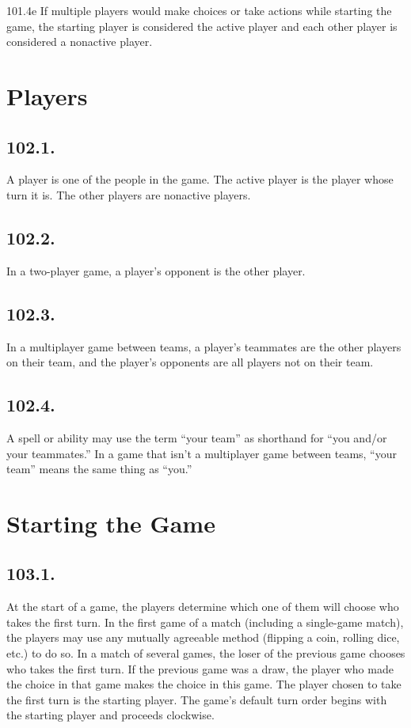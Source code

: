 101.4e If multiple players would make choices or take actions while starting the game, the starting player is considered the active player and each other player is considered a nonactive player.

\section{Players}
\subsection*{102.1.}
A player is one of the people in the game. The active player is the player whose turn it is. The other players are nonactive players.

\subsection*{102.2.}
In a two-player game, a player’s opponent is the other player.

\subsection*{102.3.}
In a multiplayer game between teams, a player’s teammates are the other players on their team, and the player’s opponents are all players not on their team.

\subsection*{102.4.}
A spell or ability may use the term “your team” as shorthand for “you and/or your teammates.” In a game that isn’t a multiplayer game between teams, “your team” means the same thing as “you.”

\section{Starting the Game}
\subsection*{103.1.}
At the start of a game, the players determine which one of them will choose who takes the first turn. In the first game of a match (including a single-game match), the players may use any mutually agreeable method (flipping a coin, rolling dice, etc.) to do so. In a match of several games, the loser of the previous game chooses who takes the first turn. If the previous game was a draw, the player who made the choice in that game makes the choice in this game. The player chosen to take the first turn is the starting player. The game’s default turn order begins with the starting player and proceeds clockwise.

